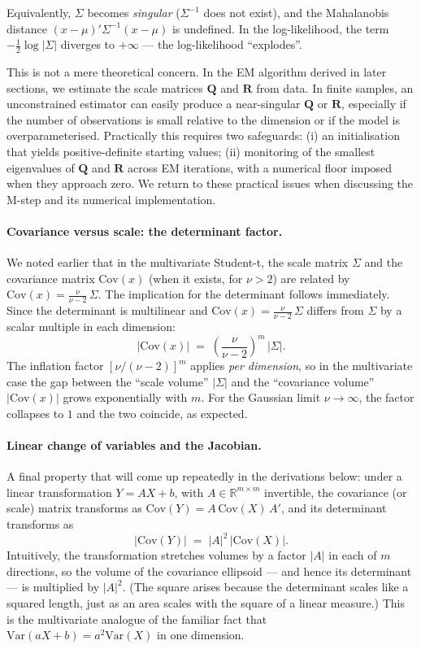 \documentclass[11pt, a4paper, oneside]{article}
\begin{document}
Equivalently, $\Sigma$ becomes \emph{singular} ($\Sigma^{-1}$ does not
exist), and the Mahalanobis distance $(x-\mu)'\Sigma^{-1}(x-\mu)$ is
undefined. In the log-likelihood, the term $-\tfrac{1}{2}\log|\Sigma|$
diverges to $+\infty$ — the log-likelihood ``explodes''.

This is not a mere theoretical concern. In the EM algorithm derived in
later sections, we estimate the scale matrices $\mathbf{Q}$ and
$\mathbf{R}$ from data. In finite samples, an unconstrained estimator
can easily produce a near-singular $\mathbf{Q}$ or $\mathbf{R}$,
especially if the number of observations is small relative to the
dimension or if the model is overparameterised. Practically this
requires two safeguards: (i) an initialisation that yields
positive-definite starting values; (ii) monitoring of the smallest
eigenvalues of $\mathbf{Q}$ and $\mathbf{R}$ across EM iterations, with
a numerical floor imposed when they approach zero. We return to these
practical issues when discussing the M-step and its numerical
implementation.

\paragraph{Covariance versus scale: the determinant factor.}
We noted earlier that in the multivariate Student-t, the scale matrix
$\Sigma$ and the covariance matrix $\mathrm{Cov}(x)$ (when it exists,
for $\nu > 2$) are related by
$\mathrm{Cov}(x) = \tfrac{\nu}{\nu - 2}\,\Sigma$. The implication for
the determinant follows immediately. Since the determinant is
multilinear and $\mathrm{Cov}(x) = \tfrac{\nu}{\nu - 2}\,\Sigma$ differs
from $\Sigma$ by a scalar multiple in each dimension:
\[
|\mathrm{Cov}(x)| \;=\; \left(\frac{\nu}{\nu - 2}\right)^{m} \, |\Sigma|.
\]
The inflation factor $[\nu/(\nu-2)]^m$ applies \emph{per dimension}, so
in the multivariate case the gap between the ``scale volume'' $|\Sigma|$
and the ``covariance volume'' $|\mathrm{Cov}(x)|$ grows exponentially
with $m$. For the Gaussian limit $\nu \to \infty$, the factor collapses
to $1$ and the two coincide, as expected.

\paragraph{Linear change of variables and the Jacobian.}
A final property that will come up repeatedly in the derivations below:
under a linear transformation $Y = A X + b$, with $A \in \mathbb{R}^{m \times m}$
invertible, the covariance (or scale) matrix transforms as
$\mathrm{Cov}(Y) = A\, \mathrm{Cov}(X)\, A'$, and its determinant
transforms as
\[
|\mathrm{Cov}(Y)| \;=\; |A|^{2}\, |\mathrm{Cov}(X)|.
\]
Intuitively, the transformation stretches volumes by a factor $|A|$ in
each of $m$ directions, so the volume of the covariance ellipsoid — and
hence its determinant — is multiplied by $|A|^{2}$. (The square arises
because the determinant scales like a squared length, just as an area
scales with the square of a linear measure.) This is the multivariate
analogue of the familiar fact that $\mathrm{Var}(aX + b) = a^{2} \mathrm{Var}(X)$
in one dimension.
\end{document}
